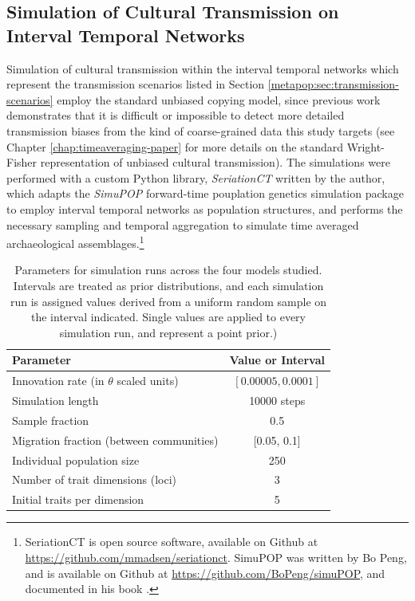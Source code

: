     \subsection{Simulation of Cultural Transmission on Interval Temporal Networks}\label{metapop:sec:simulation}
    
    Simulation of cultural transmission within the interval temporal networks which represent the transmission scenarios listed in Section \ref{metapop:sec:transmission-scenarios} employ the standard unbiased copying model, since previous work demonstrates that it is difficult or impossible to detect more detailed transmission biases from the kind of coarse-grained data this study targets (see Chapter \ref{chap:timeaveraging-paper} for more details on the standard Wright-Fisher representation of unbiased cultural transmission).  The simulations were performed with a custom Python library, \emph{SeriationCT} written by the author, which adapts the \emph{SimuPOP} forward-time pouplation genetics simulation package to employ interval temporal networks as population structures, and performs the necessary sampling and temporal aggregation to simulate time averaged archaeological assemblages.\footnote{SeriationCT is open source software, available on Github at \url{https://github.com/mmadsen/seriationct}.  SimuPOP was written by Bo Peng, and is available on Github at \url{https://github.com/BoPeng/simuPOP}, and documented in his book \citep{peng2012forward}.}
    
    \begin{table}[h]
    \begin{tabular}{lc}
    \hline
    Parameter & Value or Interval \\
    \hline
    Innovation rate (in $\theta$ scaled units)  & $[0.00005, 0.0001]$   \\
    Simulation length & 10000 steps \\
    Sample fraction & 0.5 \\
    Migration fraction (between communities) & [0.05, 0.1] \\
    Individual population size & 250 \\
    Number of trait dimensions (loci) & 3 \\
    Initial traits per dimension & 5 \\
    \hline
    \end{tabular}
    
    \caption{Parameters for simulation runs across the four models studied.  Intervals are treated as prior distributions, and each simulation run is assigned values derived from a uniform random sample on the interval indicated.  Single values are applied to every simulation run, and represent a point prior.)}
    \label{metapop:tab:simulation-parameters}
    \end{table}
    
